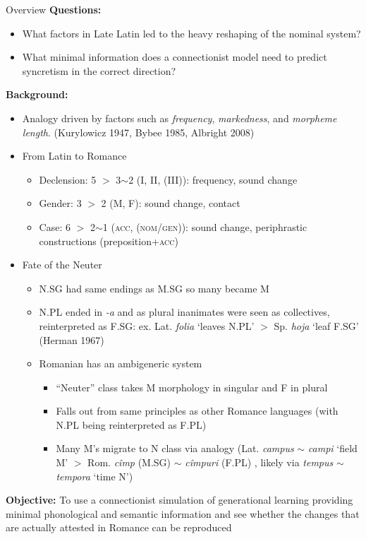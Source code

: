 \documentclass[final]{beamer}
\newlength{\onecolwid}
\newcommand{\bit}[0]{\begin{itemize}}
\newcommand{\eit}[0]{\end{itemize}}
\begin{document}
\begin{frame}[t]
\begin{columns}[t]
\begin{column}{\onecolwid}
\begin{alertblock}{Overview}
\small\textbf{Questions:} 
\bit
	\item What factors in Late Latin led to the heavy reshaping of the nominal system?
	\item What minimal information does a connectionist model need to predict syncretism in the correct direction?
\eit
\textbf{Background:}
\bit
	\item Analogy driven by factors such as \textit{frequency}, \textit{markedness}, and \textit{morpheme length}. (Kurylowicz 1947, Bybee 1985, Albright 2008)
	\item From Latin to Romance
	\bit
		\item Declension: 5 $>$ 3$\sim$2 (I, II, (III)): frequency, sound change
		\item Gender: 3 $>$ 2 (M, F): sound change, contact
		\item Case: 6 $>$ 2$\sim$1 (\textsc{acc, (nom/gen)}): sound change, periphrastic constructions (preposition+\textsc{acc})
	\eit
	\item Fate of the Neuter
	\bit
		\item N.SG had same endings as M.SG so many became M
		\item N.PL ended in \textit{-a} and as plural inanimates were seen as collectives, reinterpreted as F.SG: ex. Lat. \textit{folia} `leaves N.PL' $>$ Sp. \textit{hoja} `leaf F.SG' (Herman 1967)
		\item Romanian has an ambigeneric system
		\bit
			\item ``Neuter'' class takes M morphology in singular and F in plural
			\item Falls out from same principles as other Romance languages (with N.PL being reinterpreted as F.PL)
			\item Many M's migrate to N class via analogy (Lat. \textit{campus} $\sim$ \textit{campi} `field M' $>$ Rom. \textit{c\^imp} (M.SG) $\sim$ \textit{c\^impuri} (F.PL) , likely via \textit{tempus} $\sim$ \textit{tempora} `time N')
		\eit
	\eit
\eit
\textbf{Objective:} To use a connectionist simulation of generational learning providing minimal phonological and semantic information and see whether the changes that are actually attested in Romance can be reproduced

\end{alertblock}



\end{column}
\end{columns}
\end{frame}
\end{document}
